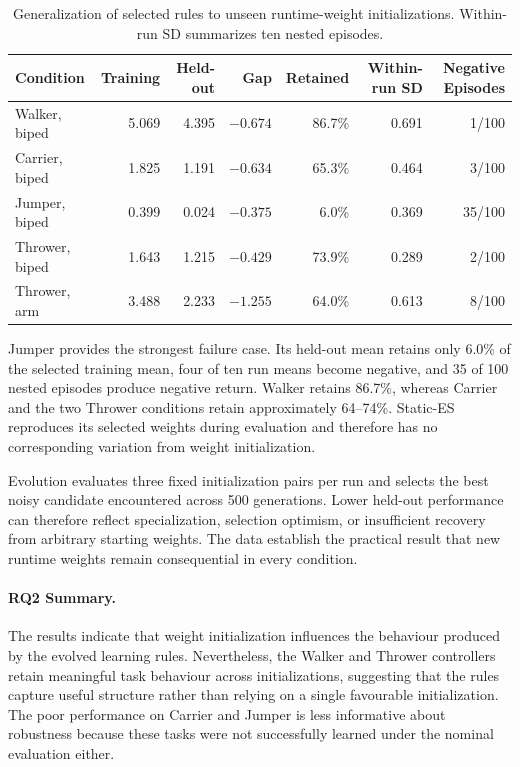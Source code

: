 \begin{table}[htbp]
  \centering
  \small
  \caption{Generalization of selected \nchl{} rules to unseen runtime-weight initializations. Within-run SD summarizes ten nested episodes.}
  \label{tab:rq2-generalization}
  \begin{tabular}{@{}lrrrrrr@{}}
    \toprule
    Condition & Training & Held-out & Gap & Retained & Within-run SD & Negative Episodes \\
    \midrule
    Walker, biped & 5.069 & 4.395 & $-0.674$ & 86.7\% & 0.691 & 1/100 \\
    Carrier, biped & 1.825 & 1.191 & $-0.634$ & 65.3\% & 0.464 & 3/100 \\
    Jumper, biped & 0.399 & 0.024 & $-0.375$ & 6.0\% & 0.369 & 35/100 \\
    Thrower, biped & 1.643 & 1.215 & $-0.429$ & 73.9\% & 0.289 & 2/100 \\
    Thrower, arm & 3.488 & 2.233 & $-1.255$ & 64.0\% & 0.613 & 8/100 \\
    \bottomrule
  \end{tabular}
\end{table}

Jumper provides the strongest failure case. Its held-out mean retains only 6.0\% of the selected training mean, four of ten run means become negative, and 35 of 100 nested episodes produce negative return. Walker retains 86.7\%, whereas Carrier and the two Thrower conditions retain approximately 64--74\%. Static-ES reproduces its selected weights during evaluation and therefore has no corresponding variation from weight initialization.

Evolution evaluates three fixed initialization pairs per run and selects the best noisy candidate encountered across 500 generations. Lower held-out performance can therefore reflect specialization, selection optimism, or insufficient recovery from arbitrary starting weights. The data establish the practical result that new runtime weights remain consequential in every condition.

\paragraph{RQ2 Summary.} The results indicate that weight initialization influences the behaviour produced by the evolved learning rules. Nevertheless, the Walker and Thrower controllers retain meaningful task behaviour across initializations, suggesting that the rules capture useful structure rather than relying on a single favourable initialization. The poor performance on Carrier and Jumper is less informative about robustness because these tasks were not successfully learned under the nominal evaluation either.

